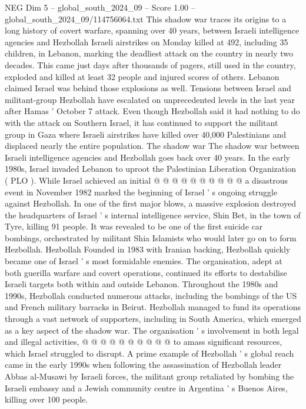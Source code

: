 \begin{textsample}{NEG Dim 5 – global\_south\_2024\_09 – Score 1.00 – global\_south\_2024\_09/114756064.txt}  \label{ex:f5_neg_225}
This shadow war traces its origins to a long history of covert warfare, spanning over 40 years, between Israeli intelligence agencies and Hezbollah Israeli airstrikes on Monday killed at 492, including 35 children, in Lebanon, marking the deadliest attack on the country in nearly two decades.
This came just days after thousands of pagers, still used in the country, exploded and killed at least 32 people and injured scores of others.
Lebanon claimed Israel was behind those explosions as well.
Tensions between Israel and militant-group Hezbollah have escalated on unprecedented levels in the last year after Hamas ' October 7 attack.
Even though Hezbollah said it had nothing to do with the attack on Southern Israel, it has continued to support the militant group in Gaza where Israeli airstrikes have killed over 40,000 Palestinians and displaced nearly the entire population.
The shadow war The shadow war between Israeli intelligence agencies and Hezbollah goes back over 40 years.
In the early 1980s, Israel invaded Lebanon to uproot the Palestinian Liberation Organization ( PLO ).
While Israel achieved an initial @ @ @ @ @ @ @ @ @ @ a disastrous event in November 1982 marked the beginning of Israel ' s ongoing struggle against Hezbollah.
In one of the first major blows, a massive explosion destroyed the headquarters of Israel ' s internal intelligence service, Shin Bet, in the town of Tyre, killing 91 people.
It was revealed to be one of the first suicide car bombings, orchestrated by militant Shia Islamists who would later go on to form Hezbollah.
Hezbollah Founded in 1983 with Iranian backing, Hezbollah quickly became one of Israel ' s most formidable enemies.
The organisation, adept at both guerilla warfare and covert operations, continued its efforts to destabilise Israeli targets both within and outside Lebanon.
Throughout the 1980s and 1990s, Hezbollah conducted numerous attacks, including the bombings of the US and French military barracks in Beirut.
Hezbollah managed to fund its operations through a vast network of supporters, including in South America, which emerged as a key aspect of the shadow war.
The organisation ' s involvement in both legal and illegal activities, @ @ @ @ @ @ @ @ @ @ to amass significant resources, which Israel struggled to disrupt.
A prime example of Hezbollah ' s global reach came in the early 1990s when following the assassination of Hezbollah leader Abbas al-Musawi by Israeli forces, the militant group retaliated by bombing the Israeli embassy and a Jewish community centre in Argentina ' s Buenos Aires, killing over 100 people.

\end{textsample}
